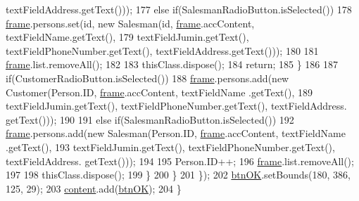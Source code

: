 \begin{DoxyCode}
      textFieldAddress.getText()));
177                         \textcolor{keywordflow}{else} \textcolor{keywordflow}{if}(SalesmanRadioButton.isSelected())
178                             \hyperlink{classpkg_1_1_person_u_i_ab7d796c52a55426d71e77f6496bd4012}{frame}.persons.set(\textcolor{keywordtype}{id}, \textcolor{keyword}{new} Salesman(\textcolor{keywordtype}{id}, \hyperlink{classpkg_1_1_person_u_i_ab7d796c52a55426d71e77f6496bd4012}{frame}.accContent, 
      textFieldName.getText(),
179                                     textFieldJumin.getText(), textFieldPhoneNumber.getText(), 
      textFieldAddress.getText()));
180                         
181                         \hyperlink{classpkg_1_1_person_u_i_ab7d796c52a55426d71e77f6496bd4012}{frame}.list.removeAll();
182                         
183                         thisClass.dispose();
184                         \textcolor{keywordflow}{return};
185                     \}
186                     
187                     \textcolor{keywordflow}{if}(CustomerRadioButton.isSelected())
188                         \hyperlink{classpkg_1_1_person_u_i_ab7d796c52a55426d71e77f6496bd4012}{frame}.persons.add(\textcolor{keyword}{new} Customer(Person.ID, \hyperlink{classpkg_1_1_person_u_i_ab7d796c52a55426d71e77f6496bd4012}{frame}.accContent, textFieldName
      .getText(),
189                                 textFieldJumin.getText(), textFieldPhoneNumber.getText(), textFieldAddress.
      getText()));
190                     
191                     \textcolor{keywordflow}{else} \textcolor{keywordflow}{if}(SalesmanRadioButton.isSelected())
192                         \hyperlink{classpkg_1_1_person_u_i_ab7d796c52a55426d71e77f6496bd4012}{frame}.persons.add(\textcolor{keyword}{new} Salesman(Person.ID, \hyperlink{classpkg_1_1_person_u_i_ab7d796c52a55426d71e77f6496bd4012}{frame}.accContent, textFieldName
      .getText(),
193                                 textFieldJumin.getText(), textFieldPhoneNumber.getText(), textFieldAddress.
      getText()));
194                     
195                     Person.ID++;
196                     \hyperlink{classpkg_1_1_person_u_i_ab7d796c52a55426d71e77f6496bd4012}{frame}.list.removeAll();
197                     
198                     thisClass.dispose();
199                 \}
200             \}
201         \});
202         \hyperlink{classpkg_1_1_person_u_i_ac8976435621b24ee0012f2553d5e168d}{btnOK}.setBounds(180, 386, 125, 29);
203         \hyperlink{classpkg_1_1_person_u_i_a05931d9e728132b35d239a5229eea21d}{content}.add(\hyperlink{classpkg_1_1_person_u_i_ac8976435621b24ee0012f2553d5e168d}{btnOK});
204     \}
\end{DoxyCode}


